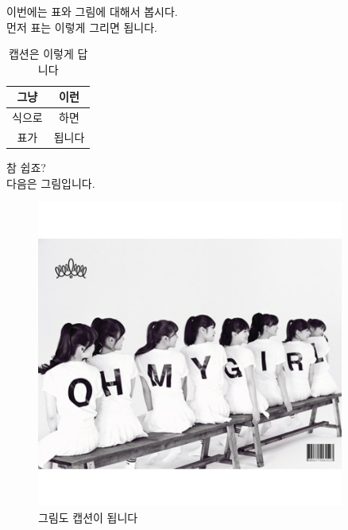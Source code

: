 \documentclass{article}
\begin{document}
	\doublespacing
	\noindent 이번에는 표와 그림에 대해서 봅시다.\\
	먼저 표는 이렇게 그리면 됩니다.
	\begin{table}[hp]
		\centering
		\begin{tabular}{|c|c|}
			\hline
			그냥 & 이런\\
			\hline
			식으로 & 하면\\
			\hline
			표가 & 됩니다\\
			\hline
		\end{tabular}
	\caption{캡션은 이렇게 답니다}
	\label{tab:eg}
	\end{table}
	참 쉽죠?\\
	다음은 그림입니다.
	\begin{figure}[hp]
		\includegraphics[width=0.9\textwidth]{OhMyGirl.jpg}
		\caption{그림도 캡션이 됩니다}
		\label{fig:eg}
	\end{figure}
\end{document}
